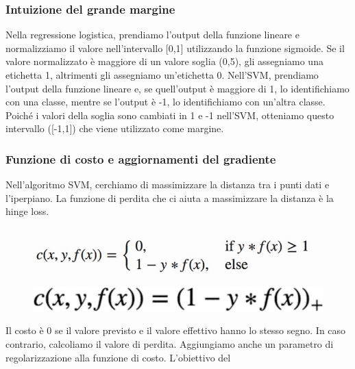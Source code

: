 \subsubsection{Intuizione del grande margine}
Nella regressione logistica, prendiamo l'output della funzione lineare e normalizziamo il valore nell'intervallo  [0,1] utilizzando la funzione sigmoide. 
Se il valore normalizzato è maggiore di un valore soglia (0,5), gli assegniamo una etichetta 1, altrimenti gli assegniamo un'etichetta 0. 
Nell'SVM, prendiamo l'output della funzione lineare e, se quell'output è maggiore di 1, lo identifichiamo con una classe, mentre se l'output è -1, lo identifichiamo con un'altra classe. 
Poiché i valori della soglia sono cambiati in 1 e -1 nell'SVM, otteniamo questo intervallo ([-1,1]) che viene utilizzato come margine.


\subsubsection{Funzione di costo e aggiornamenti del gradiente}
Nell'algoritmo SVM, cerchiamo di massimizzare la distanza tra i punti dati e l'iperpiano. La funzione di perdita che ci aiuta a massimizzare la distanza è la hinge loss.
\begin{figure}[h]
  \begin{minipage}[b]{0.45\linewidth}
    \centering
    \includegraphics[width=\linewidth]{images/image29.jpeg}
  \end{minipage}
  \begin{minipage}[b]{0.45\linewidth}
    \centering
    \includegraphics[width=\linewidth]{images/image30.jpeg}
  \end{minipage}
\end{figure}

Il costo è 0 se il valore previsto e il valore eﬀettivo hanno lo stesso segno. In caso contrario, calcoliamo il valore di perdita. Aggiungiamo anche un parametro di regolarizzazione alla funzione di costo. L'obiettivo del
 
